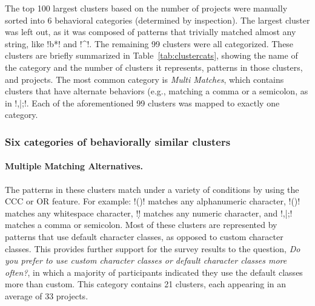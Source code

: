 

The top 100 largest clusters based on the number of projects were manually sorted into 6 behavioral categories (determined by inspection).  The largest cluster was left out, as it was composed of patterns that trivially matched almost any string, like \cverb!b*! and \cverb!^!.  The remaining 99 clusters were all categorized. These clusters are briefly summarized in Table~\ref{tab:clustercats}, showing the name of the category and the number of clusters it represents, patterns in those clusters, and projects. The most common category is \emph{Multi Matches}, which contains clusters that have alternate behaviors (e.g., matching a comma or a semicolon, as in \cverb!,|;!. Each of the aforementioned 99 clusters was mapped to exactly one category.


\subsubsection{Six categories of behaviorally similar clusters}
\label{sec:categoriesDefined}
\paragraph{Multiple Matching Alternatives.}
The patterns in these clusters match under a variety of conditions by using the CCC or OR feature.  For example: \cverb!(\W)! matches any alphanumeric character, \cverb!(\s)! matches any whitespace character, \cverb!\d! matches any numeric character, and \cverb!,|;! matches a comma or semicolon.  Most of these clusters are represented by patterns that use default character classes, as opposed to custom character classes.  This provides further support for the survey results to the question, \emph{Do you prefer to use custom character classes or default character classes more often?}, in which a majority of participants indicated they use the default classes more than custom.
This category contains 21 clusters, each appearing in an average of 33 projects.

